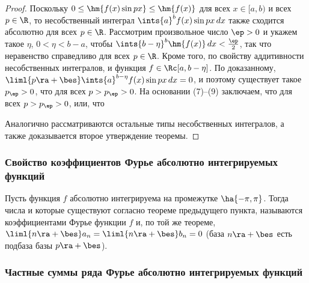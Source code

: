 \documentclass[a4paper]{article}
\begin{document}
\begin{proof}
Поскольку $0\le\hm{f(x)\sin px} \le \hm{f(x)}$ для всех $x\in[a,b)$
и всех $p\in\R$, то несобственный интеграл $\ints{a}^b f(x)\sin
px\,dx$ также сходится абсолютно для всех $p\in\R$. Рассмотрим
произвольное число $\ep>0$ и укажем такое $\eta$, $0<\eta < b-a$,
чтобы $\ints{b-\eta}^b \hm{f(x)}\,dx < \frac{\ep}2$, так что
неравенство  справедливо для всех $p\in\R$. Кроме того, по свойству
аддитивности несобственных интегралов,  и функция $f\in\Rc[a,b-\eta]$. По доказанному,
$\liml{p\ra+\bes} \ints{a}^{b-\eta} f(x)\sin px\,dx=0$, и поэтому
существует такое $p_{\ep}>0$, что  для всех $p>p_{\ep}>0$. На основании
(7)--(9) заключаем, что  для всех $p>p_{\ep}>0$, или, что

Аналогично рассматриваются остальные типы несобственных интегралов,
а также доказывается второе утверждение теоремы.

\end{proof}

\subsubsection{Свойство коэффициентов Фурье абсолютно интегрируемых
функций}

Пусть функция $f$ абсолютно интегрируема на промежутке
$\ha{-\pi,\pi}$. Тогда числа  и
 которые существуют согласно теореме предыдущего пункта,
называются коэффициентами Фурье функции $f$ и, по той же теореме,
$\liml{n\ra+\bes} a_n = \liml{n\ra+\bes} b_n = 0$ (база $n\ra+\bes$
есть подбаза базы $p\ra+\bes$).

\subsubsection{Частные суммы ряда Фурье абсолютно интегрируемых
функций}
\end{document}
